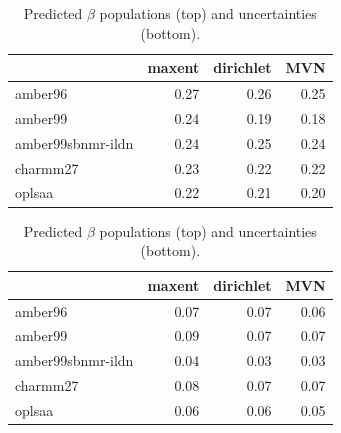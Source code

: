 \documentclass[12pt]{article}
\begin{document}
\begin{table}

\begin{tabular}{lrrr}
\toprule
{} &  maxent &  dirichlet &  MVN \\
\midrule
amber96           &    0.27 &       0.26 & 0.25 \\
amber99           &    0.24 &       0.19 & 0.18 \\
amber99sbnmr-ildn &    0.24 &       0.25 & 0.24 \\
charmm27          &    0.23 &       0.22 & 0.22 \\
oplsaa            &    0.22 &       0.21 & 0.20 \\
\bottomrule
\end{tabular}


\begin{tabular}{lrrr}
\toprule
{} &  maxent &  dirichlet &  MVN \\
\midrule
amber96           &    0.07 &       0.07 & 0.06 \\
amber99           &    0.09 &       0.07 & 0.07 \\
amber99sbnmr-ildn &    0.04 &       0.03 & 0.03 \\
charmm27          &    0.08 &       0.07 & 0.07 \\
oplsaa            &    0.06 &       0.06 & 0.05 \\
\bottomrule
\end{tabular}

\caption{
Predicted $\beta$ populations (top) and uncertainties (bottom).  
}
\end{table}

\clearpage
\end{document}
